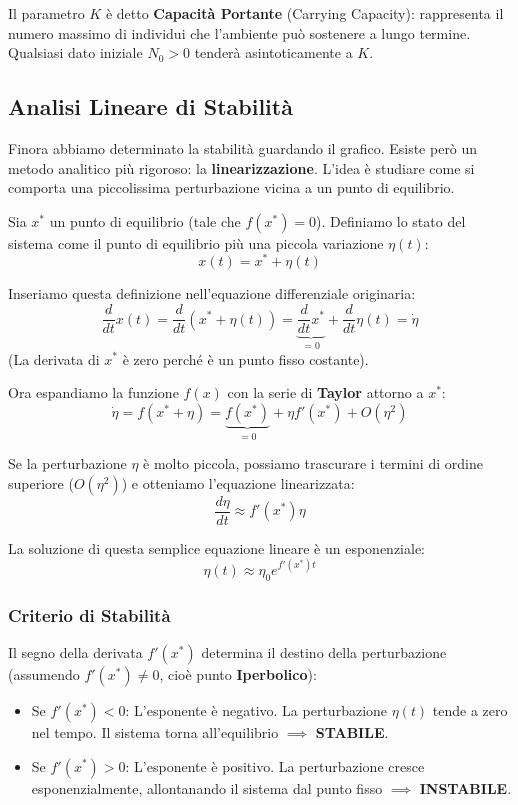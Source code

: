 \documentclass[openany]{book}
\theoremstyle{definition}
\theoremstyle{remark}
\begin{document}
Il parametro $K$ è detto \textbf{Capacità Portante} (Carrying Capacity): rappresenta il numero massimo di individui che l'ambiente può sostenere a lungo termine. Qualsiasi dato iniziale $N_0 > 0$ tenderà asintoticamente a $K$.

\subsection{Analisi Lineare di Stabilità}
Finora abbiamo determinato la stabilità guardando il grafico. Esiste però un metodo analitico più rigoroso: la \textbf{linearizzazione}. L'idea è studiare come si comporta una piccolissima perturbazione vicina a un punto di equilibrio.

Sia $x^*$ un punto di equilibrio (tale che $f(x^*) = 0$).
Definiamo lo stato del sistema come il punto di equilibrio più una piccola variazione $\eta(t)$:
\[ x(t) = x^* + \eta(t) \]

Inseriamo questa definizione nell'equazione differenziale originaria:
\[ \frac{d}{dt} x(t) = \frac{d}{dt} (x^* + \eta(t)) = \underbrace{\frac{d}{dt} x^*}_{=0} + \frac{d}{dt} \eta(t) = \dot{\eta} \]
(La derivata di $x^*$ è zero perché è un punto fisso costante).

Ora espandiamo la funzione $f(x)$ con la serie di \textbf{Taylor} attorno a $x^*$:
\[ \dot{\eta} = f(x^* + \eta) = \underbrace{f(x^*)}_{=0} + \eta f'(x^*) + O(\eta^2) \]

Se la perturbazione $\eta$ è molto piccola, possiamo trascurare i termini di ordine superiore ($O(\eta^2)$) e otteniamo l'equazione linearizzata:
\begin{equation}
    \boxed{ \frac{d\eta}{dt} \approx f'(x^*) \eta }
\end{equation}

La soluzione di questa semplice equazione lineare è un esponenziale:
\[ \eta(t) \approx \eta_0 e^{f'(x^*)t} \]

\subsubsection*{Criterio di Stabilità}
Il segno della derivata $f'(x^*)$ determina il destino della perturbazione (assumendo $f'(x^*) \neq 0$, cioè punto \textbf{Iperbolico}):

\begin{itemize}
    \item Se $f'(x^*) < 0$: L'esponente è negativo. La perturbazione $\eta(t)$ tende a zero nel tempo. Il sistema torna all'equilibrio $\implies$ \textbf{STABILE}.
    \item Se $f'(x^*) > 0$: L'esponente è positivo. La perturbazione cresce esponenzialmente, allontanando il sistema dal punto fisso $\implies$ \textbf{INSTABILE}.
\end{itemize}
\end{document}
